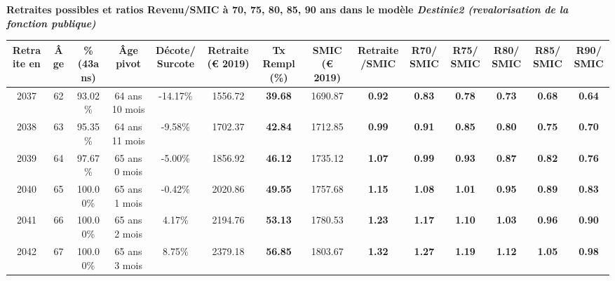  \vspace{0.1cm} 
{\bf \noindent Retraites possibles et ratios Revenu/SMIC à 70, 75, 80, 85, 90 ans dans le modèle \emph{Destinie2 (revalorisation de la fonction publique)}}  
 
\begin{adjustbox}{max width=\textwidth} 
\begin{tabular}[htb]{|c|c||c|c|c||c|c||c|c||c|c|c|c|c|} 
\hline 
 Retraite en &  Âge &  \%(43ans) &  Âge pivot &  Décote/Surcote &  Retraite (\euro{} 2019) &  Tx Rempl(\%) &  SMIC (\euro{} 2019) &  Retraite/SMIC &  R70/SMIC &  R75/SMIC &  R80/SMIC &  R85/SMIC &  R90/SMIC \\ 
\hline \hline 
 2037 &  62 &  93.02\% &  64 ans 10 mois &  -14.17\% &  1556.72 &  {\bf 39.68} &  1690.87 &  {\bf {\color{red} 0.92}} &  {\bf {\color{red} 0.83}} &  {\bf {\color{red} 0.78}} &  {\bf {\color{red} 0.73}} &  {\bf {\color{red} 0.68}} &  {\bf {\color{red} 0.64}} \\ 
\hline 
 2038 &  63 &  95.35\% &  64 ans 11 mois &  -9.58\% &  1702.37 &  {\bf 42.84} &  1712.85 &  {\bf {\color{red} 0.99}} &  {\bf {\color{red} 0.91}} &  {\bf {\color{red} 0.85}} &  {\bf {\color{red} 0.80}} &  {\bf {\color{red} 0.75}} &  {\bf {\color{red} 0.70}} \\ 
\hline 
 2039 &  64 &  97.67\% &  65 ans 0 mois &  -5.00\% &  1856.92 &  {\bf 46.12} &  1735.12 &  {\bf 1.07} &  {\bf {\color{red} 0.99}} &  {\bf {\color{red} 0.93}} &  {\bf {\color{red} 0.87}} &  {\bf {\color{red} 0.82}} &  {\bf {\color{red} 0.76}} \\ 
\hline 
 2040 &  65 &  100.00\% &  65 ans 1 mois &  -0.42\% &  2020.86 &  {\bf 49.55} &  1757.68 &  {\bf 1.15} &  {\bf 1.08} &  {\bf 1.01} &  {\bf {\color{red} 0.95}} &  {\bf {\color{red} 0.89}} &  {\bf {\color{red} 0.83}} \\ 
\hline 
 2041 &  66 &  100.00\% &  65 ans 2 mois &  4.17\% &  2194.76 &  {\bf 53.13} &  1780.53 &  {\bf 1.23} &  {\bf 1.17} &  {\bf 1.10} &  {\bf 1.03} &  {\bf {\color{red} 0.96}} &  {\bf {\color{red} 0.90}} \\ 
\hline 
 2042 &  67 &  100.00\% &  65 ans 3 mois &  8.75\% &  2379.18 &  {\bf 56.85} &  1803.67 &  {\bf 1.32} &  {\bf 1.27} &  {\bf 1.19} &  {\bf 1.12} &  {\bf 1.05} &  {\bf {\color{red} 0.98}} \\ 
\hline 
\hline 
\end{tabular} 
\end{adjustbox} 
 
 \vspace{0.1cm} 

